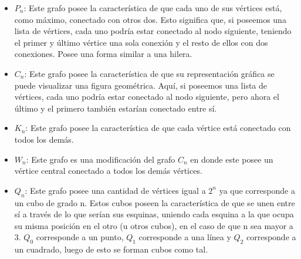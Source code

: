 \documentclass[spanish, fleqn]{article}
\begin{document}
\begin{enumerate}
\begin{itemize}
\item $P_{n}$: Este grafo posee la característica de que cada uno de sus vértices está, como máximo, conectado con otros dos. Esto significa que, si poseemos una lista de vértices, cada uno podría estar conectado al nodo siguiente, teniendo el primer y último vértice una sola conexión y el resto de ellos con dos conexiones. Posee una forma similar a una hilera.
\item $C_{n}$: Este grafo posee la característica de que su representación gráfica se puede visualizar una figura geométrica. Aquí, si poseemos una lista de vértices, cada uno podría estar conectado al nodo siguiente, pero ahora el último y el primero también estarían conectado entre sí. 
\item $K_{n}$: Este grafo posee la característica de que cada vértice está conectado con todos los demás.
\item $W_{n}$: Este grafo es una modificación del grafo $C_{n}$ en donde este posee un vértice central conectado a todos los demás vértices. 
\item $Q_{n}$: Este grafo posee una cantidad de vértices igual a $2^n$ ya que corresponde a un cubo de grado n. Estos cubos poseen la característica de que se unen entre sí a través de lo que serían sus esquinas, uniendo cada esquina a la que ocupa su misma posición en el otro (u otros cubos), en el caso de que n sea mayor a 3. $Q_0$ corresponde a un punto, $Q_1$ corresponde a una línea y $Q_2$ corresponde a un cuadrado, luego de esto se forman cubos como tal.
\end{itemize}  
\end{enumerate}
\end{document}
